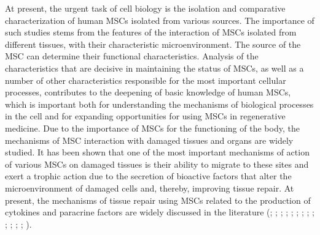 \documentclass[alpha-refs]{wiley-article}
\begin{document}
At present, the urgent task of cell biology is the isolation and comparative characterization of human MSCs isolated from various sources.
The importance of such studies stems from the features of the interaction of MSCs isolated from different tissues, with their characteristic microenvironment.
The source of the MSC can determine their functional characteristics.
Analysis of the characteristics that are decisive in maintaining the status of MSCs, as well as a number of other characteristics responsible for the most important cellular processes, contributes to the deepening of basic knowledge of human MSCs, which is important both for understanding the mechanisms of biological processes in the cell and for expanding opportunities for using MSCs in regenerative medicine.
Due to the importance of MSCs for the functioning of the body, the mechanisms of MSC interaction with damaged tissues and organs are widely studied.
It has been shown that one of the most important mechanisms of action of various MSCs on damaged tissues is their ability to migrate to these sites and exert a trophic action due to the secretion of bioactive factors that alter the microenvironment of damaged cells and, thereby, improving tissue repair.
At present, the mechanisms of tissue repair using MSCs related to the production of cytokines and paracrine factors are widely discussed in the literature (\cite{phinney2007concise}; \cite{m2011mesenchymal}; \cite{guiducci2011bone}; \cite{gruenloh2011characterization}; \cite{huang2013effects}; \cite{luo2013mesenchymal}; \cite{ando2014stem}; \cite{hendijani2015human}; \cite{hendijani2015effect}; \cite{danieli2016testing}; \cite{julianto2016topical}; \cite{teixeira2017impact}; \cite{vulcano2016wharton}; \cite{zachar2016activation}).
\end{document}
